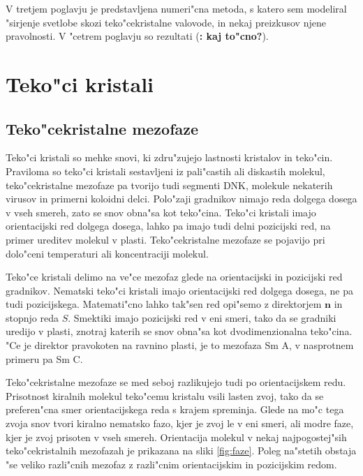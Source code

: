 \documentclass[a4paper,10pt]{article}
\newcommand{\todo}[1]{(\textbf{\textsmaller{TODO}: #1})}
\begin{document}
V tretjem poglavju je predstavljena numeri"cna metoda, s katero sem modeliral "sirjenje svetlobe skozi teko"cekristalne valovode, in nekaj preizkusov njene pravolnosti. 
V "cetrem poglavju so rezultati \todo{kaj to"cno?}. 

\section{Teko"ci kristali}

\subsection{Teko"cekristalne mezofaze}

Teko"ci kristali so mehke snovi, ki zdru"zujejo lastnosti kristalov in teko"cin\cite{degennes}. 
Praviloma so teko"ci kristali sestavljeni iz pali"castih ali diskastih molekul, teko"cekristalne mezofaze pa tvorijo tudi segmenti DNK, molekule nekaterih virusov in primerni koloidni delci. 
Polo"zaji gradnikov nimajo reda dolgega dosega v vseh smereh, zato se snov obna"sa kot teko"cina. 
Teko"ci kristali imajo orientacijski red dolgega dosega, lahko pa imajo tudi delni pozicijski red, na primer ureditev molekul v plasti. 
Teko"cekristalne mezofaze se pojavijo pri dolo"ceni temperaturi ali koncentraciji molekul. 

Teko"ce kristali delimo na ve"ce mezofaz glede na orientacijski in pozicijski red gradnikov. Nematski teko"ci kristali imajo orientacijski red dolgega dosega, ne pa tudi pozicijskega. 
Matemati"cno lahko tak"sen red opi"semo z direktorjem $\mathbf{n}$ in stopnjo reda $S$. 
Smektiki imajo pozicijski red v eni smeri, tako da se gradniki uredijo v plasti, znotraj katerih se snov obna"sa kot dvodimenzionalna teko"cina. 
"Ce je direktor pravokoten na ravnino plasti, je to mezofaza Sm A, v nasprotnem primeru pa Sm C. 

Teko"cekristalne mezofaze se med seboj razlikujejo tudi po orientacijskem redu. 
Prisotnost kiralnih molekul teko"cemu kristalu vsili lasten zvoj, tako da se preferen"cna smer orientacijskega reda s krajem spreminja. 
Glede na mo"c tega zvoja snov tvori kiralno nematsko fazo, kjer je zvoj le v eni smeri, ali modre faze, kjer je zvoj prisoten v vseh smereh. 
Orientacija molekul v nekaj najpogostej"sih teko"cekristalnih mezofazah je prikazana na sliki \ref{fig:faze}. 
Poleg na"stetih obstaja "se veliko razli"cnih mezofaz z razli"cnim orientacijskim in pozicijskim redom. 
\end{document}
